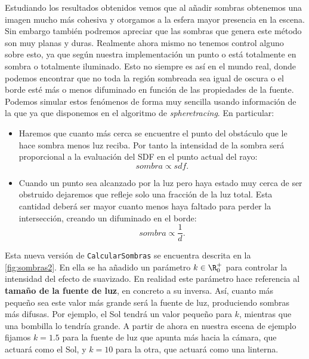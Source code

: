 Estudiando los resultados obtenidos vemos que al añadir sombras obtenemos una imagen mucho más cohesiva y otorgamos a la esfera mayor presencia en la escena. Sin embargo también podremos apreciar que las sombras que genera este método son muy planas y duras. Realmente ahora mismo no tenemos control alguno sobre esto, ya que según nuestra implementación un punto o está totalmente en sombra o totalmente iluminado. Esto no siempre es así en el mundo real, donde podemos encontrar que no toda la región sombreada sea igual de oscura o el borde esté más o menos difuminado en función de las propiedades de la fuente. Podemos simular estos fenómenos de forma muy sencilla usando información de la que ya que disponemos en el algoritmo de \textit{spheretracing}. En particular:
\begin{itemize}
    \item Haremos que cuanto más cerca se encuentre el punto del obstáculo que le hace sombra menos luz reciba. Por tanto la intensidad de la sombra será proporcional a la evaluación del SDF en el punto actual del rayo:
    \begin{equation*}
        sombra \propto sdf.
    \end{equation*}
    \item Cuando un punto sea alcanzado por la luz pero haya estado muy cerca de ser obstruido dejaremos que refleje solo una fracción de la luz total. Esta cantidad deberá ser mayor cuanto menos haya faltado para perder la intersección, creando un difuminado en el borde:
    \begin{equation*}
        sombra \propto \frac{1}{d}.
    \end{equation*}
\end{itemize}

Esta nueva versión de \texttt{CalcularSombras} se encuentra descrita en la \autoref{fig:sombras2}. En ella se ha añadido un parámetro $k\in \R_0^+$ para controlar la intensidad del efecto de suavizado. En realidad este parámetro hace referencia al \textbf{tamaño de la fuente de luz}, en concreto a su inversa. Así, cuanto más pequeño sea este valor más grande será la fuente de luz, produciendo sombras más difusas. Por ejemplo, el Sol tendrá un valor pequeño para $k$, mientras que una bombilla lo tendría grande. A partir de ahora en nuestra escena de ejemplo fijamos $k=  1.5$ para la fuente de luz que apunta más hacia la cámara, que actuará como el Sol, y $k = 10$ para la otra, que actuará como una linterna.

